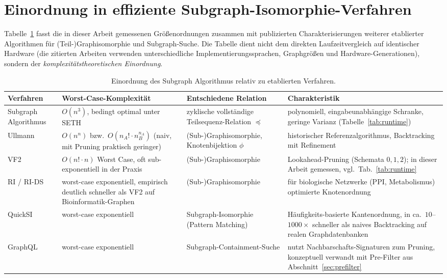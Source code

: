 \documentclass[a4paper,12pt, twoside]{report}
\theoremstyle{definition}
\begin{document}
\section{Einordnung in effiziente Subgraph-Isomorphie-Verfahren}
\label{sec:literatur_cmp}

Tabelle~\ref{tab:literatur} fasst die in dieser Arbeit gemessenen Größenordnungen zusammen mit publizierten Charakterisierungen weiterer etablierter Algorithmen für (Teil-)Graphisomorphie und Subgraph-Suche. Die Tabelle dient nicht dem direkten Laufzeitvergleich auf identischer Hardware (die zitierten Arbeiten verwenden unterschiedliche Implementierungssprachen, Graphgrößen und Hardware-Generationen), sondern der \emph{komplexitätstheoretischen Einordnung}.

\begin{table}
	\small
	\centering
	\setlength{\tabcolsep}{3pt}
	\caption{Einordnung des Subgraph Algorithmus relativ zu etablierten Verfahren.}
	\begin{tabular}{>{\raggedright\arraybackslash}p{4.2cm}>{\raggedright\arraybackslash}p{4.8cm}>{\raggedright\arraybackslash}p{4.2cm}>{\raggedright\arraybackslash}p{6.4cm}}
		\toprule
		Verfahren & Worst-Case-Komplexität & Entschiedene Relation & Charakteristik \\
		\midrule
		Subgraph Algorithmus \cite{epp2026subgraph} & $O(n^3)$, bedingt optimal unter SETH \cite{abboud2015} & zyklische vollständige Teilsequenz-Relation $\preceq$ & polynomiell, eingabeunabhängige Schranke, geringe Varianz (Tabelle~\ref{tab:runtime}) \\
		Ullmann \cite{ullmann1976} & $O(n^{n})$ bzw.\ $O(n_A!\cdot n_B^{n_A})$ (naiv, mit Pruning praktisch geringer) & (Sub-)Graphisomorphie, Knotenbijektion $\phi$ & historischer Referenzalgorithmus, Backtracking mit Refinement \\
		VF2 \cite{cordella2004} & $O(n!\cdot n)$ Worst Case, oft sub-exponentiell in der Praxis & (Sub-)Graphisomorphie & Look\-ahead-Pruning (Schemata $0,1,2$); in dieser Arbeit gemessen, vgl.\ Tab.~\ref{tab:runtime} \\
		RI / RI-DS \cite{bonnici2013} & worst-case exponentiell, empirisch deutlich schneller als VF2 auf Bioinformatik-Graphen & (Sub-)Graphisomorphie & für biologische Netzwerke (PPI, Metabolismus) optimierte Knotenordnung \\
		QuickSI \cite{he2008} & worst-case exponentiell & Subgraph-Isomorphie (Pattern Matching) & Häufigkeits-basierte Kantenordnung, in \cite{he2008} ca.\ $10$--$1000\times$ schneller als naives Backtracking auf realen Graphdatenbanken \\
		GraphQL \cite{he2008} & worst-case exponentiell & Subgraph-Containment-Suche & nutzt Nachbarschafts-Signaturen zum Pruning, konzeptuell verwandt mit Pre-Filter aus Abschnitt~\ref{sec:prefilter} \\
		\bottomrule
	\end{tabular}
	\label{tab:literatur}
\end{table}
\end{document}
